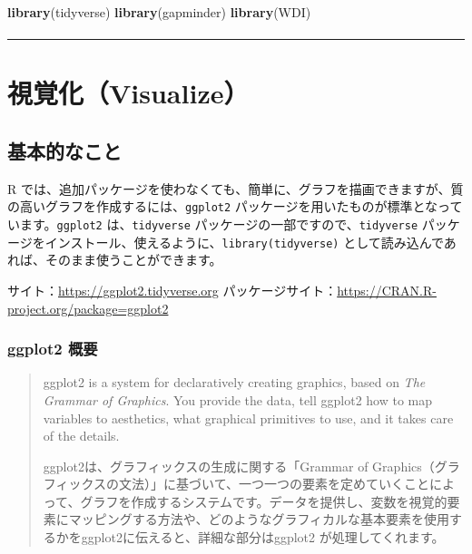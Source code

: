 \documentclass[
  xelatex, ja=standard]{bxjsbook}
\newenvironment{Shaded}{\begin{snugshade}}{\end{snugshade}}
\newcommand{\FunctionTok}[1]{\textcolor[rgb]{0.13,0.29,0.53}{\textbf{#1}}}
\newcommand{\NormalTok}[1]{#1}
\theoremstyle{definition}
\theoremstyle{definition}
\theoremstyle{definition}
\theoremstyle{definition}
\theoremstyle{remark}
\begin{document}
\begin{Shaded}
\begin{Highlighting}[]
\FunctionTok{library}\NormalTok{(tidyverse)}
\FunctionTok{library}\NormalTok{(gapminder)}
\FunctionTok{library}\NormalTok{(WDI)}
\end{Highlighting}
\end{Shaded}

\hypertarget{section}{%
\subsubsection{}\label{section}}

\begin{center}\rule{0.5\linewidth}{0.5pt}\end{center}

\hypertarget{visualize}{%
\chapter{視覚化（Visualize）}\label{visualize}}

\hypertarget{ux57faux672cux7684ux306aux3053ux3068}{%
\section{基本的なこと}\label{ux57faux672cux7684ux306aux3053ux3068}}

R では、追加パッケージを使わなくても、簡単に、グラフを描画できますが、質の高いグラフを作成するには、\texttt{ggplot2} パッケージを用いたものが標準となっています。\texttt{ggplot2} は、\texttt{tidyverse} パッケージの一部ですので、\texttt{tidyverse} パッケージをインストール、使えるように、\texttt{library(tidyverse)} として読み込んであれば、そのまま使うことができます。

サイト：\url{https://ggplot2.tidyverse.org} パッケージサイト：\url{https://CRAN.R-project.org/package=ggplot2}

\hypertarget{ggplot2-ux6982ux8981}{%
\subsection{ggplot2 概要}\label{ggplot2-ux6982ux8981}}

\begin{quote}
ggplot2 is a system for declaratively creating graphics, based on \emph{The Grammar of Graphics}. You provide the data, tell ggplot2 how to map variables to aesthetics, what graphical primitives to use, and it takes care of the details.

ggplot2は、グラフィックスの生成に関する「Grammar of Graphics（グラフィックスの文法）」に基づいて、一つ一つの要素を定めていくことによって、グラフを作成するシステムです。データを提供し、変数を視覚的要素にマッピングする方法や、どのようなグラフィカルな基本要素を使用するかをggplot2に伝えると、詳細な部分はggplot2 が処理してくれます。
\end{quote}
\end{document}
